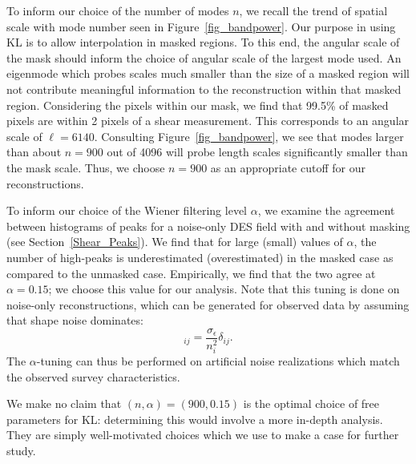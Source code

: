 To inform our choice of the number of modes $n$, we recall the trend of 
spatial scale with mode number seen in Figure~\ref{fig_bandpower}.  Our 
purpose in using KL is to allow interpolation in masked regions.  To this 
end, the angular scale of the mask should inform the choice of angular
scale of the largest mode used.  An eigenmode which probes scales much smaller
than the size of a masked region will not contribute meaningful information to
the reconstruction within that masked region.  Considering the pixels within
our mask, we find that 99.5\% of masked pixels are within 2 pixels of a
shear measurement.  This corresponds to an angular scale of $\ell=6140$.
Consulting Figure~\ref{fig_bandpower}, we see that modes larger than
about $n=900$ out of 4096 will probe length scales significantly 
smaller than the mask scale.  
Thus, we choose $n=900$ as an appropriate cutoff for our reconstructions.

To inform our choice of the Wiener filtering level $\alpha$, we examine the
agreement between histograms of \Map peaks for a noise-only DES field
with and without masking (see Section~\ref{Shear_Peaks}).  
We find that for large (small) values of $\alpha$, the number
of high-\Map peaks is underestimated (overestimated) in the masked 
case as compared to the unmasked case.  
Empirically, we find that the two agree at $\alpha = 0.15$; 
we choose this value for our analysis.  Note that this 
tuning is done on noise-only reconstructions, 
which can be generated for observed data by assuming that
shape noise dominates: 
\begin{equation}
  [\Noise_\gamma]_{ij} = \frac{\sigma_\epsilon}{n_i^2}\delta_{ij}.
\end{equation}
The $\alpha$-tuning can thus be performed on artificial noise realizations 
which match the observed survey characteristics.

We make no claim that $(n,\alpha) = (900,0.15)$ is the optimal
choice of free parameters for KL: determining this would involve a more
in-depth analysis.  They are simply well-motivated choices which we use to
make a case for further study.
